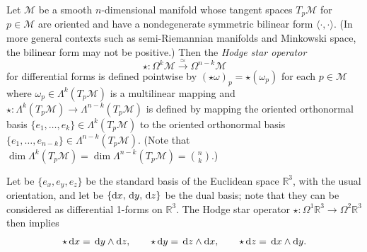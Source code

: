 \begin{definition}
	\cites[222]{Jaenich-1992}[266]{Jaenich-2001}
	Let $\mathscr{M}$ be a smooth $n$-dimensional manifold whose tangent spaces $T_p \mathscr{M}$ for $p \in \mathscr{M}$ are oriented and have a nondegenerate symmetric bilinear form $\langle \cdot,\cdot \rangle$.
	(In more general contexts such as semi-Riemannian manifolds and Minkowski space, the bilinear form may not be positive.)
	Then the \emph{Hodge star operator}
	\begin{equation}
		\star: \Omega^k \mathscr{M} \stackrel{\simeq}{\longrightarrow} \Omega^{n-k} \mathscr{M}
	\end{equation}
	for differential forms is defined pointwise by $(\star \omega)_p = \star (\omega_p)$
	for each $p \in \mathscr{M}$ where $\omega_p \in \Lambda^k (T_p \mathscr{M})$ is a multilinear mapping and $\star: \Lambda^k (T_p \mathscr{M}) \to \Lambda^{n-k} (T_p \mathscr{M})$ is defined by mapping the
	oriented orthonormal basis $\{e_1, \ldots, e_k\} \in \Lambda^{k} (T_p \mathscr{M})$ to the oriented orthonormal basis $\{e_1, \ldots, e_{n-k}\} \in \Lambda^{n-k} (T_p \mathscr{M})$.
	(Note that $\dim \Lambda^{k} (T_p \mathscr{M}) = \dim \Lambda^{n-k} (T_p \mathscr{M}) = \binom{n}{k}$.)
\end{definition}


\begin{beispiel}
	Let be $\{e_x, e_y,e_z\}$ be the standard basis of the Euclidean space $\mathbb{R}^3$, with the usual orientation, and let be $\{\!\,\mathrm{d} x, \,\mathrm{d} y, \,\mathrm{d} z\}$ be the dual basis; note that they can be considered as differential 1-forms on $\mathbb{R}^3$. The Hodge star operator $\star: \Omega^1 \mathbb{R}^3 \to \Omega^2 \mathbb{R}^3$ then implies
	\begin{equation}
		\star \,\mathrm{d} x = \,\mathrm{d} y \wedge \mathrm{d} z,
		\qquad
		\star \,\mathrm{d} y = \,\mathrm{d} z \wedge \mathrm{d} x,
		\qquad
		\star \,\mathrm{d} z = \,\mathrm{d} x \wedge \mathrm{d} y
		.
	\end{equation}
\end{beispiel}


